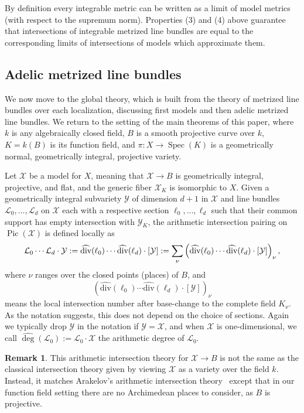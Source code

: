 \documentclass[times, doublespace]{amsart}
\numberwithin{equation}{section}
\theoremstyle{plain}
\theoremstyle{definition}
\newtheorem*{remark}{Remark}
\DeclareMathOperator{\Spec}{Spec}
\DeclareMathOperator{\Pic}{Pic}
\renewcommand{\div}{\text{div}}
\newcommand{\cX}{\mathcal{X}}
\newcommand{\cY}{\mathcal{Y}}
\newcommand{\calL}{\mathcal{L}}
\begin{document}
By definition every integrable metric can be written as a limit of model metrics (with respect to the supremum norm).  Properties (3) and (4) above guarantee that intersections of integrable metrized line bundles are equal to the corresponding limits of intersections of models which approximate them.

\subsection{Adelic metrized line bundles}
We now move to the global theory, which is built from the theory of metrized line bundles over each localization, discussing first models and then adelic metrized line bundles. We return to the setting of the main theorems of this paper, where $k$ is any algebraically closed field, $B$ is a smooth projective curve over $k$, $K=k(B)$ is its function field, and $\pi:X\to\Spec(K)$ is a geometrically normal, geometrically integral, projective variety.

Let $\cX$ be a model for $X$, meaning that $\cX\to B$ is geometrically integral, projective, and flat, and the generic fiber $\cX_K$ is isomorphic to $X$. Given a geometrically integral subvariety $\cY$ of dimension $d+1$ in $\cX$ and line bundles $\calL_0,\dots,\calL_d$ on $\cX$ each with a respective section $\ell_0,\dots,\ell_d$ such that their common support has empty intersection with $\cY_K$, the arithmetic intersection pairing on $\Pic(\cX)$ is defined locally as
\begin{equation*}
\calL_0\cdots\calL_d\cdot\cY:=\widehat{\div}(\ell_0)\cdots\widehat{\div}(\ell_d)\cdot[\cY]\\:=\sum_{\nu}\left(\widehat{\div}(\ell_0)\cdots\widehat{\div}(\ell_d)\cdot[\cY]\right)_{\nu},
\end{equation*}
where $\nu$ ranges over the closed points (places) of $B$, and 
\[\left(\widehat{\div}(\ell_0)\cdots\widehat{\div}(\ell_d)\cdot[\cY]\right)_{\nu}\]
means the local intersection number after base-change to the complete field $K_{\nu}$. As the notation suggests, this does not depend on the choice of sections. Again we typically drop $\cY$ in the notation if $\cY=\cX$, and when $\cX$ is one-dimensional, we call $\widehat{\deg}(\calL_0):=\calL_0\cdot\cX$ the arithmetic degree of $\calL_0$.

\begin{remark}This arithmetic intersection theory for $\cX\to B$ is not the same as the classical intersection theory given by viewing $\cX$ as a variety over the field $k$. Instead, it matches Arakelov's arithmetic intersection theory~\cite{arakelov2,arakelov} except that in our function field setting there are no Archimedean places to consider, as $B$ is projective.
\end{remark}
\end{document}
